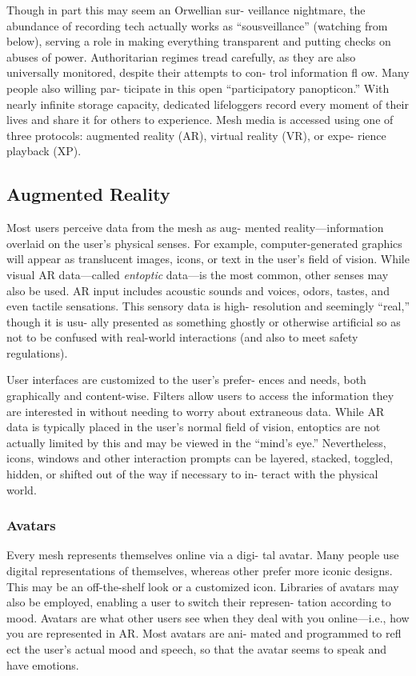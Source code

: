 Though in part this may seem an Orwellian sur-
veillance nightmare, the abundance of recording 
tech actually works as ``sousveillance'' (watching 
from below), serving a role in making everything 
transparent and putting checks on abuses of power. 
Authoritarian regimes tread carefully, as they are also 
universally monitored, despite their attempts to con-
trol information fl ow. Many people also willing par-
ticipate in this open ``participatory panopticon.'' With 
nearly infinite storage capacity, dedicated lifeloggers 
record every moment of their lives and share it for 
others to experience.
Mesh media is accessed using one of three protocols: 
augmented reality (AR), virtual reality (VR), or expe-
rience playback (XP).

\subsection{Augmented Reality}

Most users perceive data from the mesh as aug-
mented reality—information overlaid on the user's 
physical senses. For example, computer-generated 
graphics will appear as translucent images, icons, 
or text in the user's field of vision. While visual AR 
data—called  \textit{entoptic} data—is the most common, 
other senses may also be used. AR input includes 
acoustic sounds and voices, odors, tastes, and 
even tactile sensations. This sensory data is high-
resolution and seemingly ``real,'' though it is usu-
ally presented as something ghostly or otherwise 
artificial so as not to be confused with real-world 
interactions (and also to meet safety regulations).

User interfaces are customized to the user's prefer-
ences and needs, both graphically and content-wise. 
Filters allow users to access the information they 
are interested in without needing to worry about 
extraneous data. While AR data is typically placed 
in the user's normal field of vision, entoptics are not 
actually limited by this and may be viewed in the 
``mind's eye.'' Nevertheless, icons, windows and other 
interaction prompts can be layered, stacked, toggled, 
hidden, or shifted out of the way if necessary to in-
teract with the physical world.

\subsubsection{Avatars}

Every mesh represents themselves online via a digi-
tal avatar. Many people use digital representations 
of themselves, whereas other prefer more iconic 
designs. This may be an off-the-shelf look or a 
customized icon. Libraries of avatars may also be 
employed, enabling a user to switch their represen-
tation according to mood. Avatars are what other 
users see when they deal with you online—i.e., how 
you are represented in AR. Most avatars are ani-
mated and programmed to refl ect the user's actual 
mood and speech, so that the avatar seems to speak 
and have emotions.

